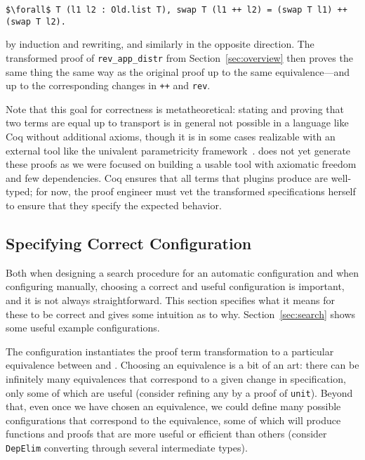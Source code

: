 \begin{lstlisting}
$\forall$ T (l1 l2 : Old.list T), swap T (l1 ++ l2) = (swap T l1) ++ (swap T l2).
\end{lstlisting}
by induction and rewriting, and similarly in the opposite direction.
The transformed proof of \lstinline{rev_app_distr} from Section~\ref{sec:overview} then proves the same thing the same way
as the original proof up to the same equivalence---and up to the corresponding changes in \lstinline{++}
and \lstinline{rev}.

Note that this goal for correctness is metatheoretical:
stating and proving that two terms are equal up to transport is in general not possible in a language like Coq
without additional axioms, though it is in some cases realizable with an external tool like the
univalent parametricity framework~\cite{tabareau2017equivalences}.
\toolname does not yet generate these proofs as we were focused on building a usable tool with axiomatic freedom and few dependencies.
Coq ensures that all terms that plugins produce are well-typed; for now, %
the proof engineer must vet the transformed specifications herself to ensure that they specify the expected behavior.

\subsection{Specifying Correct Configuration}
\label{sec:art}

Both when designing a search procedure for an automatic configuration and when
configuring \toolname manually, choosing a correct and useful configuration is important,
and it is not always straightforward. This section specifies what it means for these
to be correct and gives some intuition as to why.
Section~\ref{sec:search} shows some useful example configurations.

The configuration instantiates the proof term transformation to a particular equivalence between \A and \B.
Choosing an equivalence is a bit of an art:
there can be infinitely many equivalences that correspond to a 
given change in specification, only some of which are useful (consider refining any \A by a proof of \lstinline{unit}).
Beyond that, even once we have chosen an equivalence, we could define many possible configurations that correspond
to the equivalence, some of which will produce functions and proofs that are more useful or efficient than others
(consider \lstinline{DepElim} converting through several intermediate types).

